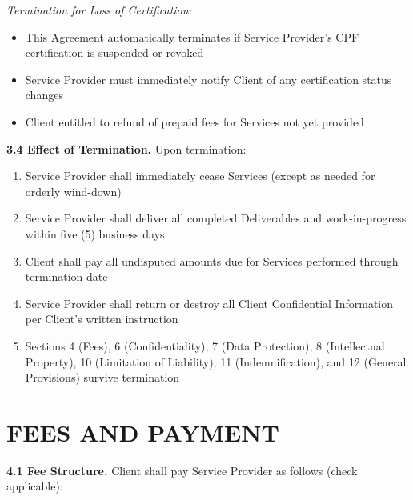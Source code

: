 \documentclass[11pt,a4paper]{article}
\begin{document}
\textit{Termination for Loss of Certification:}
\begin{itemize}
\item This Agreement automatically terminates if Service Provider's CPF certification is suspended or revoked
\item Service Provider must immediately notify Client of any certification status changes
\item Client entitled to refund of prepaid fees for Services not yet provided
\end{itemize}

\textbf{3.4 Effect of Termination.} Upon termination:

\begin{enumerate}[label=\alph*)]
\item Service Provider shall immediately cease Services (except as needed for orderly wind-down)
\item Service Provider shall deliver all completed Deliverables and work-in-progress within five (5) business days
\item Client shall pay all undisputed amounts due for Services performed through termination date
\item Service Provider shall return or destroy all Client Confidential Information per Client's written instruction
\item Sections 4 (Fees), 6 (Confidentiality), 7 (Data Protection), 8 (Intellectual Property), 10 (Limitation of Liability), 11 (Indemnification), and 12 (General Provisions) survive termination
\end{enumerate}

\section{FEES AND PAYMENT}

\textbf{4.1 Fee Structure.} Client shall pay Service Provider as follows (check applicable):
\end{document}
